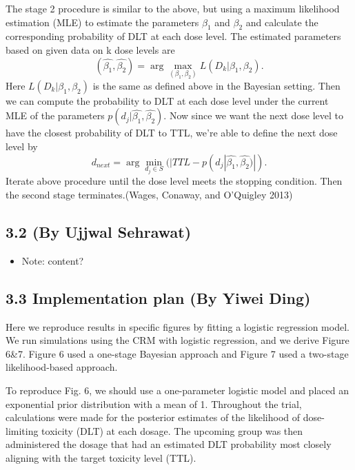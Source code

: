 \documentclass[
]{article}
\providecommand{\tightlist}{%
  \setlength{\itemsep}{0pt}\setlength{\parskip}{0pt}}
\begin{document}
The stage 2 procedure is similar to the above, but using a maximum
likelihood estimation (MLE) to estimate the parameters \(\beta_1\) and
\(\beta_2\) and calculate the corresponding probability of DLT at each
dose level. The estimated parameters based on given data on k dose
levels are
\[(\hat{\beta_1},\hat{\beta_2})=\arg\max_{(\beta_1,\beta_2)} L(D_k|\beta_1,\beta_2).\]
Here \(L(D_k|\beta_1,\beta_2)\) is the same as defined above in the
Bayesian setting. Then we can compute the probability to DLT at each
dose level under the current MLE of the parameters
\(p(d_j|\hat{\beta_1},\hat{\beta_2})\). Now since we want the next dose
level to have the closest probability of DLT to TTL, we're able to
define the next dose level by
\[d_{next}=\arg\min_{d_j\in S}(|TTL-p(d_j|\hat{\beta_1},\hat{\beta_2})|).\]
Iterate above procedure until the dose level meets the stopping
condition. Then the second stage terminates.(Wages, Conaway, and
O'Quigley 2013)

\hypertarget{by-ujjwal-sehrawat}{%
\subsection{3.2 (By Ujjwal Sehrawat)}\label{by-ujjwal-sehrawat}}

\begin{itemize}
\tightlist
\item
  Note: content?
\end{itemize}

\hypertarget{implementation-plan-by-yiwei-ding}{%
\subsection{3.3 Implementation plan (By Yiwei
Ding)}\label{implementation-plan-by-yiwei-ding}}

Here we reproduce results in specific figures by fitting a logistic
regression model. We run simulations using the CRM with logistic
regression, and we derive Figure 6\&7. Figure 6 used a one-stage
Bayesian approach and Figure 7 used a two-stage likelihood-based
approach.

To reproduce Fig. 6, we should use a one-parameter logistic model and
placed an exponential prior distribution with a mean of 1. Throughout
the trial, calculations were made for the posterior estimates of the
likelihood of dose-limiting toxicity (DLT) at each dosage. The upcoming
group was then administered the dosage that had an estimated DLT
probability most closely aligning with the target toxicity level (TTL).
\end{document}
